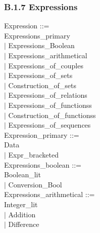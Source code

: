 \documentclass[12pt,a4paper,draft]{article}
\begin{document}
\subsubsection{B.1.7 Expressions }
\footnotesize{
\begin{sloppypar} 
\noindent Expression ::= \\
\hspace*{0.20in}   Expressions\_primary\\
\hspace*{0.20in} $|$  Expressions\_Boolean\\
\hspace*{0.20in} $|$  Expressions\_arithmetical\\
\hspace*{0.20in} $|$  Expressions\_of\_couples\\
\hspace*{0.20in} $|$  Expressions\_of\_sets\\
\hspace*{0.20in} $|$  Construction\_of\_sets\\
\hspace*{0.20in} $|$  Expressions\_of\_relations\\
\hspace*{0.20in} $|$  Expressions\_of\_functionss\\
\hspace*{0.20in} $|$  Construction\_of\_functionss\\
\hspace*{0.20in} $|$  Expressions\_of\_sequences\\
Expression\_primary ::= \\
\hspace*{0.20in}   Data\\
\hspace*{0.20in} $|$  Expr\_bracketed\\
Expressions\_boolean ::= \\
\hspace*{0.20in}   Boolean\_lit\\
\hspace*{0.20in} $|$  Conversion\_Bool\\
Expressions\_arithmetical ::= \\
\hspace*{0.20in}  Integer\_lit \\
\hspace*{0.20in} $|$  Addition\\
\hspace*{0.20in} $|$  Difference\\

\end{sloppypar}}
\end{document}
